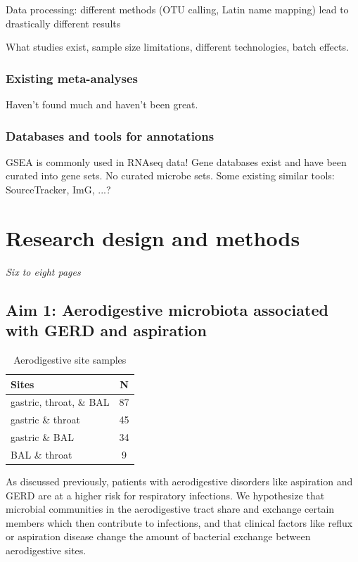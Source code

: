 \documentclass[12pt]{article}
\begin{document}
Data processing: different methods (OTU calling, Latin name mapping) lead to drastically different results

What studies exist, sample size limitations, different technologies, batch effects.

\subsubsection{Existing meta-analyses}
Haven't found much and haven't been great.

\subsubsection{Databases and tools for annotations}
GSEA is commonly used in RNAseq data! Gene databases exist and have been curated into gene sets.
No curated microbe sets. Some existing similar tools: SourceTracker, ImG, ...?

\section{Research design and methods}
\textit{Six to eight pages}

\subsection{Aim 1: Aerodigestive microbiota associated with GERD and aspiration}

\begin{table}
\begin{tabular}{|l|c|}
	\hline
	\textbf{Sites} & \textbf{N} \\
	\hline
	gastric, throat, \& BAL & 87 \\
	gastric \& throat & 45 \\
	gastric \& BAL & 34 \\
	BAL \& throat & 9 \\
	\hline 
\end{tabular}
\caption{Aerodigestive site samples}\label{tab:rosen_samples}
\end{table}

As discussed previously, patients with aerodigestive disorders like aspiration and GERD are at a higher risk for respiratory infections. We hypothesize that microbial communities in the aerodigestive tract share and exchange certain members which then contribute to infections, and that clinical factors like reflux or aspiration disease change the amount of bacterial exchange between aerodigestive sites.
\end{document}
